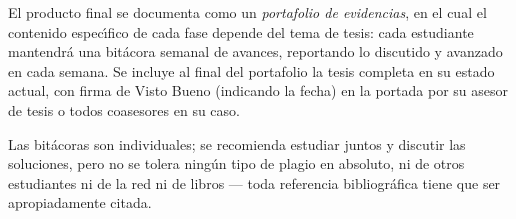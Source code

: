 El producto final se documenta como un {\em portafolio de evidencias},
en el cual el contenido espec\'{\i}fico de cada fase depende del tema
de tesis: cada estudiante mantendr\'{a} una bit\'{a}cora semanal de
avances, reportando lo discutido y avanzado en cada semana. Se incluye
al final del portafolio la tesis completa en su estado actual, con
firma de Visto Bueno (indicando la fecha) en la portada por su asesor
de tesis o todos coasesores en su caso.

Las bit\'{a}coras son individuales; se recomienda estudiar juntos y
discutir las soluciones, pero no se tolera ning\'{u}n tipo de plagio
en absoluto, ni de otros estudiantes ni de la red ni de libros ---
toda referencia bibliogr\'{a}fica tiene que ser apropiadamente citada.



